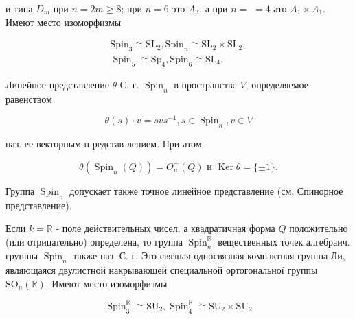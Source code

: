 \documentclass[10pt]{article}
\begin{document}
и типа $D_{m}$ при $n=2 m \geqslant 8$; при $n=6$ это $A_{3}$, а при $n=$ $=4$ әто $A_{1} \times A_{1}$. Имеют место изоморфизмы



\[

\begin{gathered}

\mathrm{Spin}_{3} \cong \mathrm{SL}_{2}, \mathrm{Spin}_{n} \cong \mathrm{SL}_{2} \times \mathrm{SL}_{2}, \\

\operatorname{Spin}_{5} \cong \mathrm{Sp}_{4}, \mathrm{Spin}_{6} \cong \mathrm{SL}_{4} .

\end{gathered}

\]



Линейное представление $\theta$ С. г. $\operatorname{Spin}_{n}$ в пространстве $V$, определяемое равенством



\[

\theta(s) \cdot v=s v s^{-1}, s \in \operatorname{Spin}_{n}, v \in V

\]



наз. ее векторным п редстав лением. При әтом



\[

\theta\left(\operatorname{Spin}_{n}(Q)\right)=O_{n}^{+}(Q) \text { и } \operatorname{Ker} \theta=\{ \pm 1\} .

\]



Группа $\operatorname{Spin}_{n}$ допускает также точное линейное представление (см. Спинорное представление).



Если $k=\mathbb{R}$ - поле действительных чисел, а квадратичная форма $Q$ положительно (или отрицательно) определена, то группа $\operatorname{Spin}_{n}^{\mathbb{R}}$ вещественных точек алгебраич. групшы $\operatorname{Spin}_{n}$ также наз. С. г. Это связная односвязная компактная грушпа Ли, являющаяся двулистной накрывающей специальной ортогональної группы $\mathrm{SO}_{n}(\mathbb{R})$. Имеют место изоморфизмы



\[

\operatorname{Spin}_{3}^{\mathbb{R}} \cong \mathrm{SU}_{2}, \operatorname{Spin}_{4}^{\mathbb{R}} \cong \mathrm{SU}_{2} \times \mathrm{SU}_{2}

\]
\end{document}
